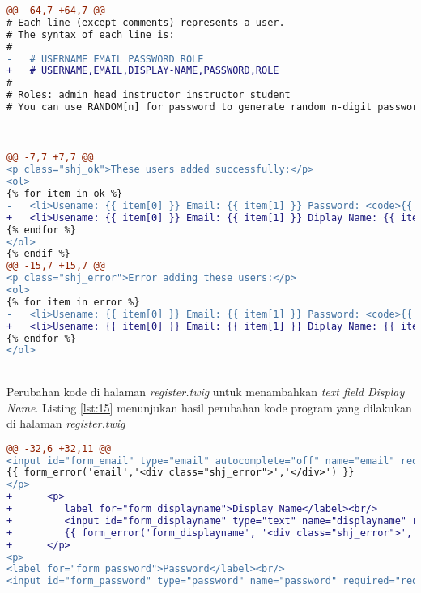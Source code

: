 \begin{lstlisting}[language=diff, caption=Perubahan kode program pada halaman \textit{add\_user.twig}, label=lst:13, basicstyle=\ttfamily, frame=single,
columns=fullflexible, keepspaces=true, breaklines=true]
@@ -64,7 +64,7 @@
# Each line (except comments) represents a user.
# The syntax of each line is:
#
-   # USERNAME EMAIL PASSWORD ROLE
+   # USERNAME,EMAIL,DISPLAY-NAME,PASSWORD,ROLE
#
# Roles: admin head_instructor instructor student
# You can use RANDOM[n] for password to generate random n-digit password.
\end{lstlisting}
~\\

\begin{lstlisting}[language=diff, caption=Perubahan kode program pada halaman \textit{add\_user\_result.twig}, label=lst:14, basicstyle=\ttfamily, frame=single,
columns=fullflexible, keepspaces=true, breaklines=true]
@@ -7,7 +7,7 @@
<p class="shj_ok">These users added successfully:</p>
<ol>
{% for item in ok %}
-   <li>Usename: {{ item[0] }} Email: {{ item[1] }} Password: <code>{{ item[2] }}</code> Role: {{ item[3] }}</li>
+   <li>Usename: {{ item[0] }} Email: {{ item[1] }} Diplay Name: {{ item[2] }} Password: <code>{{ item[3] }}</code> Role: {{ item[4] }} </li>
{% endfor %}
</ol>
{% endif %}
@@ -15,7 +15,7 @@
<p class="shj_error">Error adding these users:</p>
<ol>
{% for item in error %}
-   <li>Usename: {{ item[0] }} Email: {{ item[1] }} Password: <code>{{ item[2] }}</code> Role: {{ item[3] }} ({{ item[4] }})</li>
+   <li>Usename: {{ item[0] }} Email: {{ item[1] }} Diplay Name: {{ item[2] }} Password: <code>{{ item[3] }}</code> Role: {{ item[4] }} ({{ item[5] }})</li>
{% endfor %}
</ol>
\end{lstlisting}
~\\
Perubahan kode di halaman \textit{register.twig} untuk menambahkan \textit{text field Display Name}. Listing \ref{lst:15} menunjukan hasil perubahan kode program yang dilakukan di halaman \textit{register.twig}
\begin{lstlisting}[language=diff, caption=Perubahan kode program pada halaman \textit{register.twig}, label=lst:15, basicstyle=\ttfamily, frame=single,
columns=fullflexible, keepspaces=true, breaklines=true]
@@ -32,6 +32,11 @@
<input id="form_email" type="email" autocomplete="off" name="email" required="required" class="sharif_input" value="{{ set_value('email') }}"/>
{{ form_error('email','<div class="shj_error">','</div>') }}
</p>
+      <p>
+         label for="form_displayname">Display Name</label><br/>
+         <input id="form_displayname" type="text" name="displayname" required="required" pattern="[A-Za-z\s]+" title="The Display Name field must be contain only alphabetical letters" class="sharif_input" value="{{ set_value('displayname') }}"/>
+         {{ form_error('form_displayname', '<div class="shj_error">', '</div>') }}
+      </p>
<p>
<label for="form_password">Password</label><br/>
<input id="form_password" type="password" name="password" required="required" pattern=".{6,200}" title="The Password field must be at least 6 characters in length" class="sharif_input"/>
\end{lstlisting}

